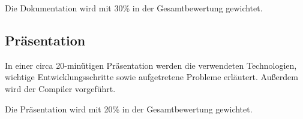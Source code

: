 Die Dokumentation wird mit 30\% in der Gesamtbewertung gewichtet.

\subsection{Präsentation}
In einer circa 20-minütigen Präsentation werden die verwendeten Technologien, wichtige Entwicklungsschritte sowie aufgetretene Probleme erläutert. Außerdem wird der Compiler vorgeführt. 

Die Präsentation wird mit 20\% in der Gesamtbewertung gewichtet.
